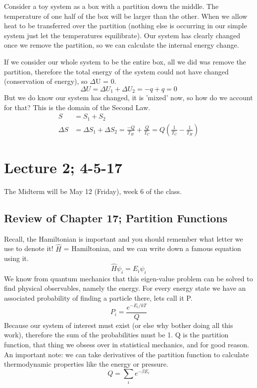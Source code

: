 \documentclass{article}
\begin{document}
Consider a toy system as a box with a partition down the middle.
The temperature of one half of the box will be larger than the other.
When we allow heat to be transferred over the partition (nothing else is occurring in our simple system just let the temperatures equilibrate).
Our system has clearly changed once we remove the partition, so we can calculate the internal energy change. 

If we consider our whole system to be the entire box, all we did was remove the partition, therefore the total energy of the system could not have changed (conservation of energy), so $\Delta$U = 0.
\begin{equation}
    \Delta U = \Delta U_1 + \Delta U_2 = -q + q = 0 
\end{equation}
But we do know our system has changed, it is 'mixed' now, so how do we account for that?
This is the domain of the Second Law.
\begin{equation}
\begin{split}
      S &= S_1 + S_2 \\
      \Delta S &= \Delta S_1 + \Delta S_2 = \frac{-Q}{T_H} + \frac{Q}{T_C} = Q\left( \frac{1}{T_C} - \frac{1}{T_H} \right )
\end{split}
\end{equation}

\section{Lecture 2; 4-5-17}
The Midterm will be May 12 (Friday), week 6 of the class. 

\subsection*{Review of Chapter 17; Partition Functions}
Recall, the Hamiltonian is important and you should remember what letter we use to denote it!
$\hat{H}$ = Hamiltonian, and we can write down a famous equation using it. 
\begin{equation}
\hat{H}\psi_i = E_i\psi_i
\end{equation}
We know from quantum mechanics that this eigen-value problem can be solved to find physical observables, namely the energy.
For every energy state we have an associated probability of finding a particle there, lets call it P. 
\begin{equation}
P_i = \frac{e^{-E_i/kT}}{Q}
\end{equation}
Because our system of interest must exist (or else why bother doing all this work), therefore the sum of the probabilities must be 1.
Q is the partition function, that thing we obsess over in statistical mechanics, and for good reason. 
An important note: we can take derivatives of the partition function to calculate thermodynamic properties like the energy or pressure. 
\begin{equation}
Q = \sum_i e^{-\beta E_i}
\end{equation}
\end{document}
